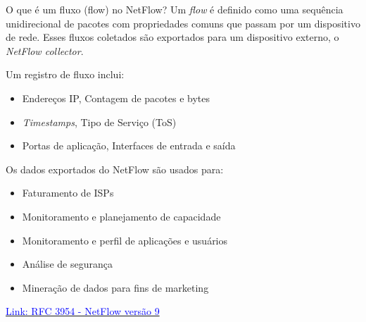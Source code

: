 \begin{frame}{O que é um fluxo (flow) no NetFlow?}
Um \textit{flow} é definido como uma sequência unidirecional de pacotes com propriedades comuns que passam por um dispositivo de rede. Esses fluxos coletados são exportados para um dispositivo externo, o \textit{NetFlow collector}.

\vspace{0.3cm}
Um registro de fluxo inclui:
\begin{itemize}
    \item Endereços IP, Contagem de pacotes e bytes
    \item \textit{Timestamps}, Tipo de Serviço (ToS)
    \item Portas de aplicação, Interfaces de entrada e saída
\end{itemize}

\vspace{0.3cm}
Os dados exportados do NetFlow são usados para:
\begin{itemize}
    \item Faturamento de ISPs
    \item Monitoramento e planejamento de capacidade
    \item Monitoramento e perfil de aplicações e usuários
    \item Análise de segurança
    \item Mineração de dados para fins de marketing
\end{itemize}

\href{https://datatracker.ietf.org/doc/html/rfc3954}{\textcolor{blue}{Link: RFC 3954 -  NetFlow versão 9}}

\end{frame}


